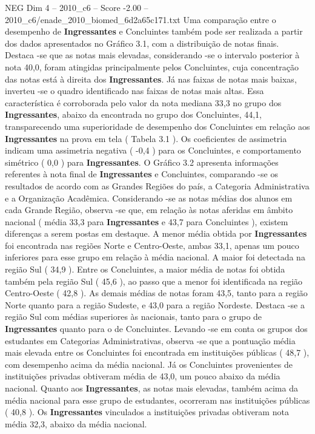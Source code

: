 \begin{textsample}{NEG Dim 4 – 2010\_c6 – Score -2.00 – 2010\_c6/enade\_2010\_biomed\_6d2a65c171.txt}
Uma comparação entre o desempenho de \textbf{Ingressantes} e Concluintes também pode ser realizada a partir dos dados apresentados no Gráfico 3.1, com a distribuição de notas finais.
Destaca -se que as notas mais elevadas, considerando -se o intervalo posterior à nota 40,0, foram atingidas principalmente pelos Concluintes, cuja concentração das notas está à direita dos \textbf{Ingressantes}.
Já nas faixas de notas mais baixas, inverteu -se o quadro identificado nas faixas de notas mais altas.
Essa característica é corroborada pelo valor da nota mediana 33,3 no grupo dos \textbf{Ingressantes}, abaixo da encontrada no grupo dos Concluintes, 44,1, transparecendo uma superioridade de desempenho dos Concluintes em relação aos \textbf{Ingressantes} na prova em tela ( Tabela 3.1 ).
Os coeficientes de assimetria indicam uma assimetria negativa ( -0,4 ) para os Concluintes, e comportamento simétrico ( 0,0 ) para \textbf{Ingressantes}.
O Gráfico 3.2 apresenta informações referentes à nota final de \textbf{Ingressantes} e Concluintes, comparando -se os resultados de acordo com as Grandes Regiões do país, a Categoria Administrativa e a Organização Acadêmica.
Considerando -se as notas médias dos alunos em cada Grande Região, observa -se que, em relação às notas aferidas em âmbito nacional ( média 33,3 para \textbf{Ingressantes} e 43,7 para Concluintes ), existem diferenças a serem postas em destaque.
A menor média obtida por \textbf{Ingressantes} foi encontrada nas regiões Norte e Centro-Oeste, ambas 33,1, apenas um pouco inferiores para esse grupo em relação à média nacional.
A maior foi detectada na região Sul ( 34,9 ).
Entre os Concluintes, a maior média de notas foi obtida também pela região Sul ( 45,6 ), ao passo que a menor foi identificada na região Centro-Oeste ( 42,8 ).
As demais médias de notas foram 43,5, tanto para a região Norte quanto para a região Sudeste, e 43,0 para a região Nordeste.
Destaca -se a região Sul com médias superiores às nacionais, tanto para o grupo de \textbf{Ingressantes} quanto para o de Concluintes.
Levando -se em conta os grupos dos estudantes em Categorias Administrativas, observa -se que a pontuação média mais elevada entre os Concluintes foi encontrada em instituições públicas ( 48,7 ), com desempenho acima da média nacional.
Já os Concluintes provenientes de instituições privadas obtiveram média de 43,0, um pouco abaixo da média nacional.
Quanto aos \textbf{Ingressantes}, as notas mais elevadas, também acima da média nacional para esse grupo de estudantes, ocorreram nas instituições públicas ( 40,8 ).
Os \textbf{Ingressantes} vinculados a instituições privadas obtiveram nota média 32,3, abaixo da média nacional.

\end{textsample}
